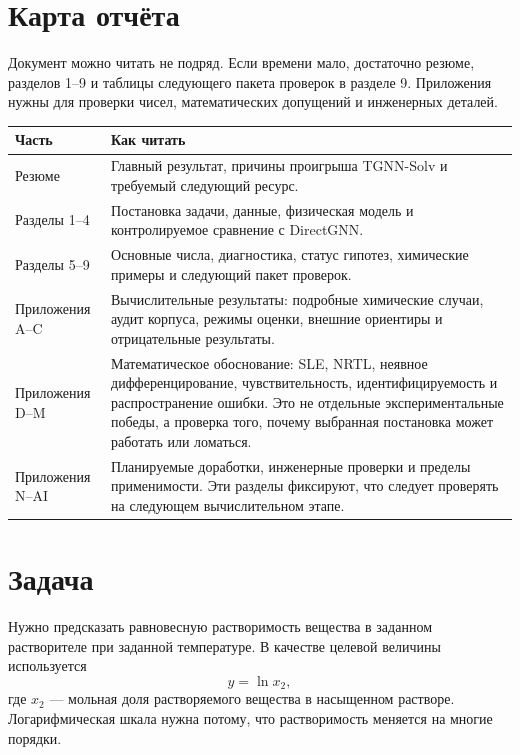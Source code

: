 \documentclass[11pt]{article}
\theoremstyle{definition}
\begin{document}
\newpage

\section*{Карта отчёта}

Документ можно читать не подряд. Если времени мало, достаточно резюме, разделов 1--9 и таблицы следующего пакета проверок в разделе 9. Приложения нужны для проверки чисел, математических допущений и инженерных деталей.

\begin{center}
\footnotesize
\begin{tabularx}{\textwidth}{P{0.25\textwidth}Y}
\toprule
Часть & Как читать \\
\midrule
Резюме & Главный результат, причины проигрыша TGNN-Solv и требуемый следующий ресурс. \\
Разделы 1--4 & Постановка задачи, данные, физическая модель и контролируемое сравнение с DirectGNN. \\
Разделы 5--9 & Основные числа, диагностика, статус гипотез, химические примеры и следующий пакет проверок. \\
Приложения A--C & Вычислительные результаты: подробные химические случаи, аудит корпуса, режимы оценки, внешние ориентиры и отрицательные результаты. \\
Приложения D--M & Математическое обоснование: SLE, NRTL, неявное дифференцирование, чувствительность, идентифицируемость и распространение ошибки. Это не отдельные экспериментальные победы, а проверка того, почему выбранная постановка может работать или ломаться. \\
Приложения N--AI & Планируемые доработки, инженерные проверки и пределы применимости. Эти разделы фиксируют, что следует проверять на следующем вычислительном этапе. \\
\bottomrule
\end{tabularx}
\end{center}

\newpage
\tableofcontents
\newpage

\section{Задача}

Нужно предсказать равновесную растворимость вещества в заданном растворителе при заданной температуре. В качестве целевой величины используется
\begin{equation*}
    y=\ln x_2,
\end{equation*}
где $x_2$ --- мольная доля растворяемого вещества в насыщенном растворе. Логарифмическая шкала нужна потому, что растворимость меняется на многие порядки.
\end{document}
